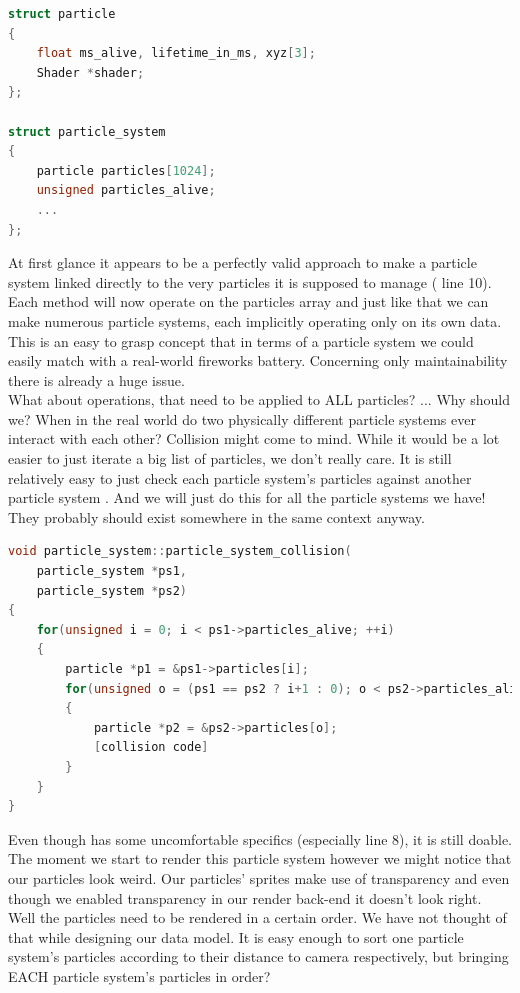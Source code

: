  \begin{lstlisting}[language=C++,name={ OOP typical, simplified particle system implementation},label={particle_system}]
struct particle
{
	float ms_alive, lifetime_in_ms, xyz[3];
	Shader *shader;
};

struct particle_system
{
	particle particles[1024];
	unsigned particles_alive;
	...
};
\end{lstlisting}
At first glance it appears to be a perfectly valid approach to make a particle system linked directly to the very particles it is supposed to manage ( line 10). Each method will now operate on the particles array and just like that we can make numerous particle systems, each implicitly operating only on its own data. This is an easy to grasp concept that in terms of a particle system we could easily match with a real-world fireworks battery. Concerning only maintainability there is already a huge issue.\\
What about operations, that need to be applied to ALL particles? ... Why should we? When in the real world do two physically different particle systems ever interact with each other? Collision might come to mind. While it would be a lot easier to just iterate a big list of particles, we don't really care. It is still relatively easy to just check each particle system's particles against another particle system . And we will just do this for all the particle systems we have! They probably should exist somewhere in the same context anyway.\\
 \begin{lstlisting}[language=C++,name={Example code how OOP could handle collision between different particle systems' particles},label={collision}]
void particle_system::particle_system_collision(
	particle_system *ps1,
	particle_system *ps2)
{
	for(unsigned i = 0; i < ps1->particles_alive; ++i)
	{
		particle *p1 = &ps1->particles[i];
		for(unsigned o = (ps1 == ps2 ? i+1 : 0); o < ps2->particles_alive; ++o)
		{
			particle *p2 = &ps2->particles[o];
			[collision code]
		}
	}
}
\end{lstlisting}
Even though  has some uncomfortable specifics (especially line 8), it is still doable. The moment we start to render this particle system however we might notice that our particles look weird. Our particles' sprites make use of transparency and even though we enabled transparency in our render back-end it doesn't look right. Well the particles need to be rendered in a certain order. We have not thought of that while designing our data model. It is easy enough to sort one particle system's particles according to their distance to camera respectively, but bringing EACH particle system's particles in order?\\
